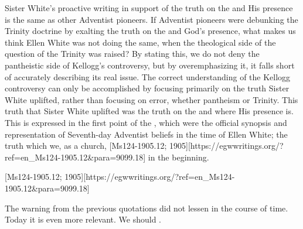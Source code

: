 Sister White’s proactive writing in support of the truth on the  and His presence is the same as other Adventist pioneers. If Adventist pioneers were debunking the Trinity doctrine by exalting the truth on the  and God’s presence, what makes us think Ellen White was not doing the same, when the theological side of the question of the Trinity was raised? By stating this, we do not deny the pantheistic side of Kellogg’s controversy, but by overemphasizing it, it falls short of accurately describing its real issue. The correct understanding of the Kellogg controversy can only be accomplished by focusing primarily on the truth Sister White uplifted, rather than focusing on error, whether pantheism or Trinity. This truth that Sister White uplifted was the truth on the  and where His presence is. This is expressed in the first point of the , which were the official synopsis and representation of Seventh-day Adventist beliefs in the time of Ellen White; the truth which we, as a church, [Ms124-1905.12; 1905][https://egwwritings.org/?ref=en\_Ms124-1905.12&para=9099.18] in the beginning.

[Ms124-1905.12; 1905][https://egwwritings.org/?ref=en\_Ms124-1905.12&para=9099.18]

The warning from the previous quotations did not lessen in the course of time. Today it is even more relevant. We should .